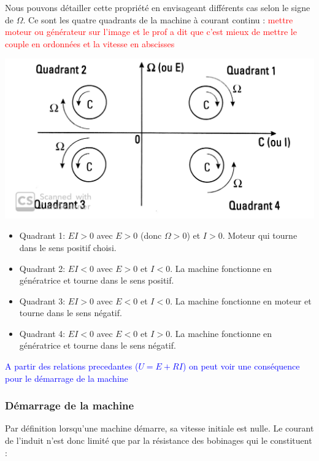 \documentclass{article}
\begin{document}
Nous pouvons détailler cette propriété en envisageant différents cas selon le signe de $\Omega$. Ce sont les quatre quadrants de la machine à courant continu : \textcolor{red}{mettre moteur ou générateur sur l'image et le prof a dit que c'est mieux de mettre le couple en ordonnées et la vitesse en abscisses}


\begin{center}
    \includegraphics[scale=0.18]{quadrants.jpg}
\end{center}


\begin{itemize}
    \item Quadrant 1: $EI>0$ avec $E>0$ (donc $\Omega >0$) et $I>0$. Moteur qui tourne dans le sens positif choisi.
    \item Quadrant 2: $EI<0$ avec $E>0$ et $I<0$. La machine fonctionne en génératrice et tourne dans le sens positif.
    \item Quadrant 3: $EI>0$ avec $E<0$ et $I<0$. La machine fonctionne en moteur et tourne dans le sens négatif.
    \item Quadrant 4: $EI<0$ avec $E<0$ et $I>0$. La machine fonctionne en génératrice et tourne dans le sens négatif.
\end{itemize}

\textcolor{blue}{A partir des relations precedantes ($U = E + RI$) on peut voir une conséquence pour le démarrage de la machine}


\subsubsection*{Démarrage de la machine}

Par définition lorsqu'une machine démarre, sa vitesse initiale est nulle. Le courant de l'induit n'est donc limité que par la résistance des bobinages qui le constituent :
\end{document}

